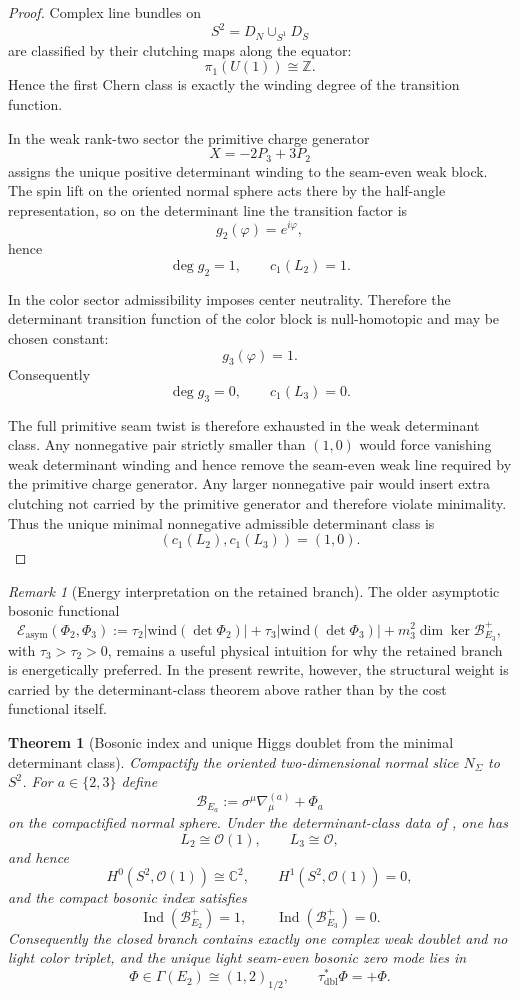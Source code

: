 \documentclass[11pt,a4paper]{article}
\newtheorem{theorem}{Theorem}[section]
\theoremstyle{definition}
\theoremstyle{remark}
\newtheorem*{remark}{Remark}
\DeclareMathOperator{\Ind}{Ind}
\newcommand{\Seam}{\Sigma}
\newcommand{\taudbl}{\tau_{\mathrm{dbl}}}
\begin{document}
\begin{proof}
Complex line bundles on
\[
S^2=D_N\cup_{S^1}D_S
\]
are classified by their clutching maps along the equator:
\[
\pi_1(U(1))\cong \mathbb Z.
\]
Hence the first Chern class is exactly the winding degree of the transition function.

In the weak rank-two sector the primitive charge generator
\[
X=-2P_3+3P_2
\]
assigns the unique positive determinant winding to the seam-even weak block. The spin lift on the
oriented normal sphere acts there by the half-angle representation, so on the determinant line the
transition factor is
\[
g_2(\varphi)=e^{i\varphi},
\]
hence
\[
\deg g_2=1,
\qquad
c_1(L_2)=1.
\]

In the color sector admissibility imposes center neutrality. Therefore the determinant transition
function of the color block is null-homotopic and may be chosen constant:
\[
g_3(\varphi)=1.
\]
Consequently
\[
\deg g_3=0,
\qquad
c_1(L_3)=0.
\]

The full primitive seam twist is therefore exhausted in the weak determinant class. Any nonnegative
pair strictly smaller than $(1,0)$ would force vanishing weak determinant winding and hence remove
the seam-even weak line required by the primitive charge generator. Any larger nonnegative pair
would insert extra clutching not carried by the primitive generator and therefore violate
minimality. Thus the unique minimal nonnegative admissible determinant class is
\[
(c_1(L_2),c_1(L_3))=(1,0).
\]
\end{proof}

\begin{remark}[Energy interpretation on the retained branch]
The older asymptotic bosonic functional
\[
\mathcal E_{\mathrm{asym}}(\Phi_2,\Phi_3)
:=
\tau_2\bigl|\mathrm{wind}(\det\Phi_2)\bigr|
+\tau_3\bigl|\mathrm{wind}(\det\Phi_3)\bigr|
+m_3^2\dim\ker\mathcal B_{E_3}^+,
\]
with $\tau_3>\tau_2>0$, remains a useful physical intuition for why the retained branch is energetically preferred. In the present rewrite, however, the structural weight is carried by the determinant-class theorem above rather than by the cost functional itself.
\end{remark}

\begin{theorem}[Bosonic index and unique Higgs doublet from the minimal determinant class]
\label{thm:callias-higgs-selection}
\label{thm:compact-higgs-unique}
\label{thm:compact-determinant-higgs-index}
Compactify the oriented two-dimensional normal slice $N_\Seam$ to $S^2$. For $a\in\{2,3\}$
define
\[
\mathcal B_{E_a}:=\sigma^\mu\nabla^{(a)}_\mu+\Phi_a
\]
on the compactified normal sphere. Under the determinant-class data of
, one has
\[
L_2\cong\mathcal O(1),
\qquad
L_3\cong\mathcal O,
\]
and hence
\[
H^0(S^2,\mathcal O(1))\cong\mathbb C^2,
\qquad
H^1(S^2,\mathcal O(1))=0,
\]
and the compact bosonic index satisfies
\[
\Ind(\mathcal B_{E_2}^+)=1,
\qquad
\Ind(\mathcal B_{E_3}^+)=0.
\]
Consequently the closed branch contains exactly one complex weak doublet and no light color triplet,
and the unique light seam-even bosonic zero mode lies in
\[
\Phi\in\Gamma(E_2)\cong (1,2)_{1/2},
\qquad
\taudbl^{\ast}\Phi=+\Phi.
\]
\end{theorem}
\end{document}
